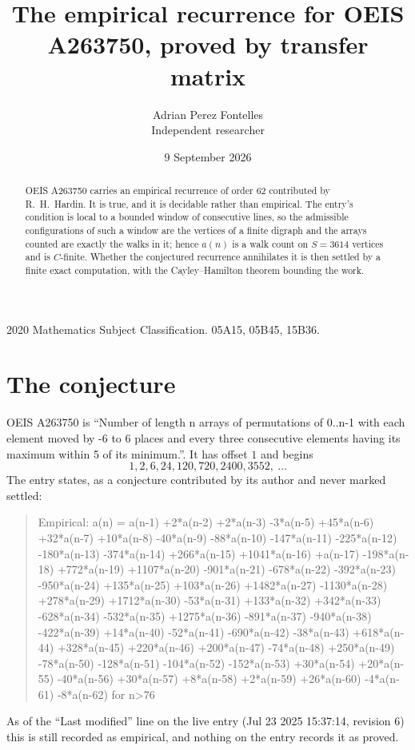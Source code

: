 \documentclass[11pt,a4paper]{article}
\title{The empirical recurrence for OEIS A263750, proved by transfer matrix}
\author{Adrian Perez Fontelles\\ \small Independent researcher}
\date{9 September 2026}
\theoremstyle{plain}
\theoremstyle{definition}
\begin{document}
\maketitle

\begin{abstract}
OEIS A263750 carries an empirical recurrence of order $62$ contributed by R.~H.~Hardin. It is
true, and it is decidable rather than empirical. The entry's condition is local to a bounded window of consecutive lines, so
the admissible configurations of such a window are the vertices of a finite digraph and the
arrays counted are exactly the walks in it; hence $a(n)$ is a walk count on $S=3614$ vertices
and is $C$-finite. Whether the conjectured recurrence annihilates it is then settled by a
finite exact computation, with the Cayley--Hamilton theorem bounding the work.
\end{abstract}

\noindent\small 2020 Mathematics Subject Classification. 05A15, 05B45, 15B36.\normalsize

\section{The conjecture}

OEIS A263750 is ``Number of length n arrays of permutations of 0..n-1 with each element moved by -6 to 6 places and every three consecutive elements having its maximum within 5 of its minimum.''. It has offset $1$ and begins
\[
1, 2, 6, 24, 120, 720, 2400, 3552,\ \dots
\]
The entry states, as a conjecture contributed by its author and never marked settled:
\begin{quote}
Empirical: a(n) = a(n-1) +2*a(n-2) +2*a(n-3) -3*a(n-5) +45*a(n-6) +32*a(n-7) +10*a(n-8) -40*a(n-9) -88*a(n-10) -147*a(n-11) -225*a(n-12) -180*a(n-13) -374*a(n-14) +266*a(n-15) +1041*a(n-16) +a(n-17) -198*a(n-18) +772*a(n-19) +1107*a(n-20) -901*a(n-21) -678*a(n-22) -392*a(n-23) -950*a(n-24) +135*a(n-25) +103*a(n-26) +1482*a(n-27) -1130*a(n-28) +278*a(n-29) +1712*a(n-30) -53*a(n-31) +133*a(n-32) +342*a(n-33) -628*a(n-34) -532*a(n-35) +1275*a(n-36) -891*a(n-37) -940*a(n-38) -422*a(n-39) +14*a(n-40) -52*a(n-41) -690*a(n-42) -38*a(n-43) +618*a(n-44) +328*a(n-45) +220*a(n-46) +200*a(n-47) -74*a(n-48) +250*a(n-49) -78*a(n-50) -128*a(n-51) -104*a(n-52) -152*a(n-53) +30*a(n-54) +20*a(n-55) -40*a(n-56) +30*a(n-57) +8*a(n-58) +2*a(n-59) +26*a(n-60) -4*a(n-61) -8*a(n-62) for n>76
\end{quote}
As of the ``Last modified'' line on the live entry (Jul 23 2025 15:37:14, revision 6) this is still
recorded as empirical, and nothing on the entry records it as proved.
\end{document}
